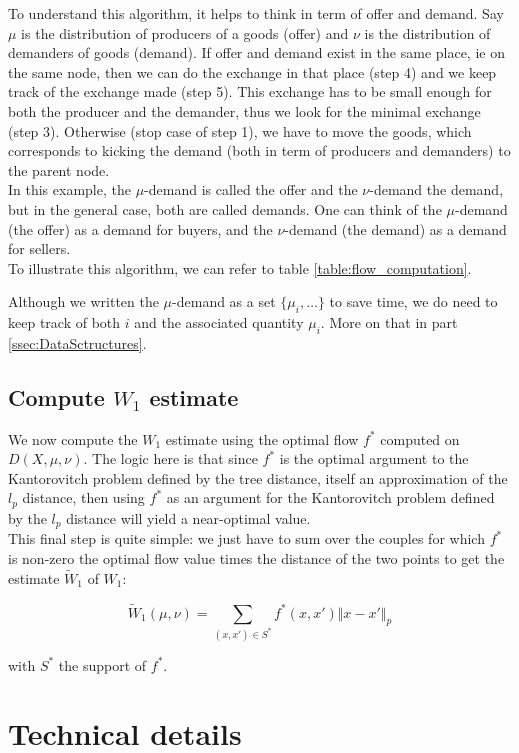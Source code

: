 \documentclass[11pt]{article}
\begin{document}
To understand this algorithm, it helps to think in term of offer and demand. Say $\mu$ is the distribution of producers of a goods (offer) and $\nu$ is the distribution of demanders of goods (demand). If offer and demand exist in the same place, ie on the same node, then we can do the exchange in that place (step 4) and we keep track of the exchange made (step 5). This exchange has to be small enough for both the producer and the demander, thus we look for the minimal exchange (step 3). Otherwise (stop case of step 1), we have to move the goods, which corresponds to kicking the demand (both in term of producers and demanders) to the parent node.\\
In this example, the $\mu$-demand is called the offer and the $\nu$-demand the demand, but in the general case, both are called demands. One can think of the $\mu$-demand (the offer) as a demand for buyers, and the $\nu$-demand (the demand) as a demand for sellers. \\
To illustrate this algorithm, we can refer to table \ref{table:flow_computation}.

Although we written the $\mu$-demand as a set $\lbrace \mu_i, \dots \rbrace$ to save time, we do need to keep track of both $i$ and the associated quantity $\mu_i$. More on that in part \ref{ssec:DataSctructures}. 

\subsection{Compute $W_1$ estimate}
We now compute the $W_1$ estimate using the optimal flow $f^*$ computed on $D(X, \mu, \nu)$. The logic here is that since $f^*$ is the optimal argument to the Kantorovitch problem defined by the tree distance, itself an approximation of the $l_p$ distance, then using $f^*$ as an argument for the Kantorovitch problem defined by the $l_p$ distance will yield a near-optimal value.\\

This final step is quite simple: we just have to sum over the couples for which $f^*$ is non-zero the optimal flow value times the distance of the two points to get the estimate $\widetilde{W}_1$ of $W_1$:

$$
\widetilde{W}_1(\mu, \nu) = \sum_{(x, x') \in S^*} f^*(x, x') \Vert x - x' \Vert_p
$$ 

with $S^*$ the support of $f^*$.

\section{Technical details}
\end{document}
